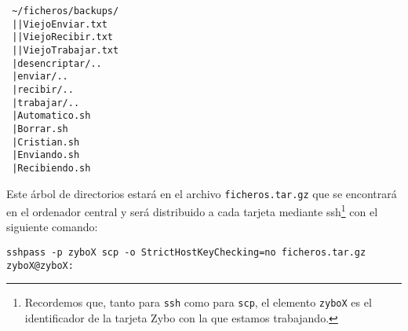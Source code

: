 \texttt{
\textasciitilde/ficheros/backups/\\
\textcolor{white}{.}\hspace{3.15cm}|\hspace{1.8cm}|ViejoEnviar.txt\\
\textcolor{white}{.}\hspace{3.15cm}|\hspace{1.8cm}|ViejoRecibir.txt\\
\textcolor{white}{.}\hspace{3.15cm}|\hspace{1.8cm}|ViejoTrabajar.txt\\
\textcolor{white}{.}\hspace{3.15cm}|desencriptar/..\\
\textcolor{white}{.}\hspace{3.15cm}|enviar/..\\
\textcolor{white}{.}\hspace{3.15cm}|recibir/..\\
\textcolor{white}{.}\hspace{3.15cm}|trabajar/..\\
\textcolor{white}{.}\hspace{3.15cm}|Automatico.sh\\
\textcolor{white}{.}\hspace{3.15cm}|Borrar.sh\\
\textcolor{white}{.}\hspace{3.15cm}|Cristian.sh\\
\textcolor{white}{.}\hspace{3.15cm}|Enviando.sh\\
\textcolor{white}{.}\hspace{3.15cm}|Recibiendo.sh\\
}

Este árbol de directorios estará en el archivo \texttt{ficheros.tar.gz} que se encontrará en el ordenador central y será distribuido a cada tarjeta mediante ssh\footnote{Recordemos que, tanto para \texttt{ssh} como para \texttt{scp}, el elemento \texttt{zyboX} es el identificador de la tarjeta Zybo con la que estamos trabajando.} con el siguiente comando:
\begin{center}
	\texttt{sshpass -p zyboX scp -o StrictHostKeyChecking=no ficheros.tar.gz zyboX@zyboX:}
\end{center}

